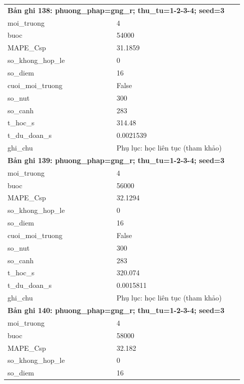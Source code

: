 \begin{longtable}{p{0.43\linewidth}p{0.50\linewidth}}
\midrule
\multicolumn{2}{p{0.95\linewidth}}{\textbf{Bản ghi 138: phuong\_phap=gng\_r; thu\_tu=1-2-3-4; seed=3}} \\
moi\_\allowbreak truong & 4 \\
buoc & 54000 \\
MAPE\_\allowbreak Csp & 31.1859 \\
so\_\allowbreak khong\_\allowbreak hop\_\allowbreak le & 0 \\
so\_\allowbreak diem & 16 \\
cuoi\_\allowbreak moi\_\allowbreak truong & False \\
so\_\allowbreak nut & 300 \\
so\_\allowbreak canh & 283 \\
t\_\allowbreak hoc\_\allowbreak s & 314.48 \\
t\_\allowbreak du\_\allowbreak doan\_\allowbreak s & 0.0021539 \\
ghi\_\allowbreak chu & Phụ lục: học liên tục (tham khảo) \\
\midrule
\multicolumn{2}{p{0.95\linewidth}}{\textbf{Bản ghi 139: phuong\_phap=gng\_r; thu\_tu=1-2-3-4; seed=3}} \\
moi\_\allowbreak truong & 4 \\
buoc & 56000 \\
MAPE\_\allowbreak Csp & 32.1294 \\
so\_\allowbreak khong\_\allowbreak hop\_\allowbreak le & 0 \\
so\_\allowbreak diem & 16 \\
cuoi\_\allowbreak moi\_\allowbreak truong & False \\
so\_\allowbreak nut & 300 \\
so\_\allowbreak canh & 283 \\
t\_\allowbreak hoc\_\allowbreak s & 320.074 \\
t\_\allowbreak du\_\allowbreak doan\_\allowbreak s & 0.0015811 \\
ghi\_\allowbreak chu & Phụ lục: học liên tục (tham khảo) \\
\midrule
\multicolumn{2}{p{0.95\linewidth}}{\textbf{Bản ghi 140: phuong\_phap=gng\_r; thu\_tu=1-2-3-4; seed=3}} \\
moi\_\allowbreak truong & 4 \\
buoc & 58000 \\
MAPE\_\allowbreak Csp & 32.182 \\
so\_\allowbreak khong\_\allowbreak hop\_\allowbreak le & 0 \\
so\_\allowbreak diem & 16 \\

\end{longtable}
